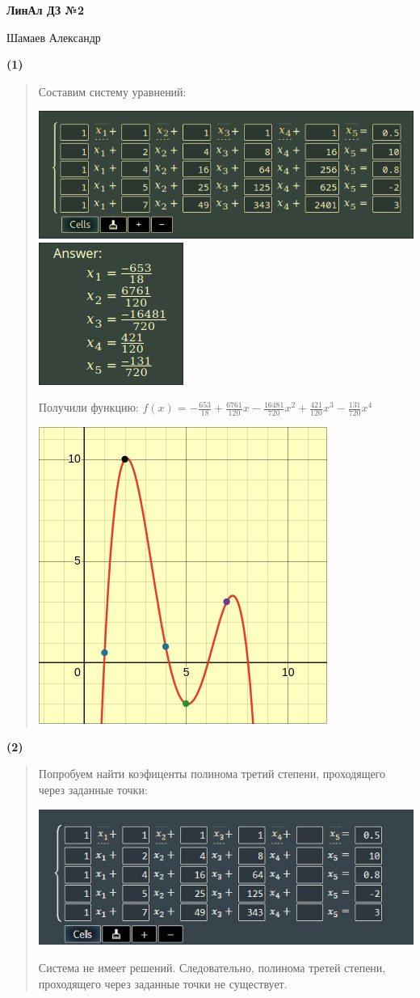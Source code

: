 \documentclass{article}
\begin{document}
\setlength{\parindent}{0pt}
\begin{Large}
    \textsf{\textbf{ЛинАл ДЗ №2}}
    
    Шамаев Александр    
\end{Large}
\vspace{1cm}

\textsf{\textbf{(1)}}

\hspace{1cm}
\begin{quote}

Составим систему уравнений:    

\includegraphics[width=0.5\linewidth]{2024-09-13-234400_hyprshot.png}
\includegraphics[width=0.2\linewidth]{image.png}

Получили функцию:
$f(x) = -\frac{653}{18}+\frac{6761}{120}x-\frac{16481}{720}x^{2}+\frac{421}{120}x^{3}-\frac{131}{720}x^{4}$

\includegraphics[width=0.5\linewidth]{2024-09-13-235821_hyprshot.png}

\end{quote}

\textsf{\textbf{(2)}}

\hspace{1cm}
\begin{quote}
Попробуем найти коэфиценты полинома третий степени, проходящего через заданные точки:

\includegraphics[width=0.5\linewidth]{photo_2024-09-15_15-44-11.jpg}

Система не имеет решений. Следовательно, полинома третей степени, проходящего через заданные точки не существует.
\end{quote}
\end{document}
